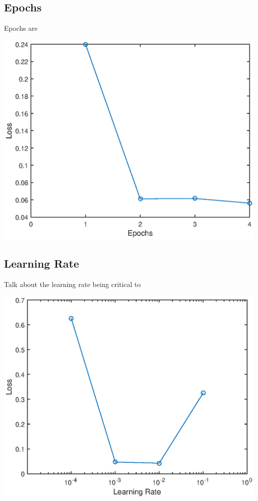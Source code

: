 \documentclass[a4paper]{article}
\begin{document}
\subsection{Epochs}
\begin{minipage}{0.45\textwidth}
Epochs are 
\end{minipage}
\begin{minipage}{0.45\textwidth}
\centering
\includegraphics[scale=0.5]{hyp_par_2}
\end{minipage}


\subsection{Learning Rate}
\begin{minipage}{0.45\textwidth}
Talk about the learning rate being critical to 
\end{minipage}
\hspace{1cm}
\begin{minipage}{0.45\textwidth}
\centering
\includegraphics[scale=0.5]{hyp_par_3}
\end{minipage}
\end{document}
